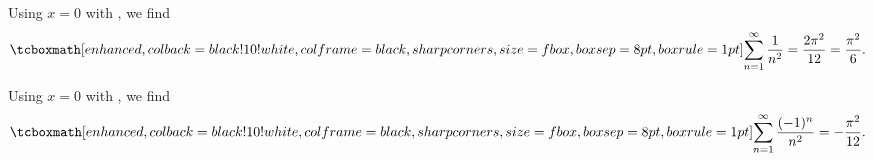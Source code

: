 Using $x = 0$ with , we find
\begin{eqnarray}
    \label{eq:id-6}
    \eqbox{
    \sum_{n=1}^{\infty} \frac{1}{n^2} = \frac{2\pi^2}{12} = \frac{\pi^2}{6} 
}
.\end{eqnarray}



Using $x = 0$ with , we find
\begin{eqnarray}
    \label{eq:id-7}
    \eqbox{
    \sum_{n=1}^{\infty} \frac{(-1)^{n}}{n^2} = -\frac{\pi^2}{12}
}
.\end{eqnarray}




